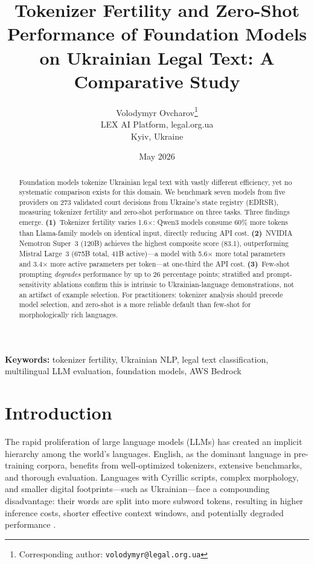 \documentclass[11pt,a4paper]{article}
\title{Tokenizer Fertility and Zero-Shot Performance of Foundation Models\\on Ukrainian Legal Text: A Comparative Study}
\author{
  Volodymyr Ovcharov\thanks{Corresponding author: \texttt{volodymyr@legal.org.ua}} \\
  LEX AI Platform, legal.org.ua \\
  Kyiv, Ukraine
}
\date{May 2026}
\begin{document}
\maketitle

\begin{abstract}
Foundation models tokenize Ukrainian legal text with vastly different efficiency, yet no systematic comparison exists for this domain. We benchmark seven models from five providers on 273 validated court decisions from Ukraine's state registry (EDRSR), measuring tokenizer fertility and zero-shot performance on three tasks. Three findings emerge. \textbf{(1)}~Tokenizer fertility varies 1.6$\times$: Qwen3 models consume 60\% more tokens than Llama-family models on identical input, directly reducing API cost. \textbf{(2)}~NVIDIA Nemotron Super~3 (120B) achieves the highest composite score (83.1), outperforming Mistral Large~3 (675B total, 41B active)---a model with 5.6$\times$ more total parameters and 3.4$\times$ more active parameters per token---at one-third the API cost. \textbf{(3)}~Few-shot prompting \emph{degrades} performance by up to 26 percentage points; stratified and prompt-sensitivity ablations confirm this is intrinsic to Ukrainian-language demonstrations, not an artifact of example selection. For practitioners: tokenizer analysis should precede model selection, and zero-shot is a more reliable default than few-shot for morphologically rich languages.
\end{abstract}

\noindent\textbf{Keywords:} tokenizer fertility, Ukrainian NLP, legal text classification, multilingual LLM evaluation, foundation models, AWS Bedrock

\section{Introduction}

The rapid proliferation of large language models (LLMs) has created an implicit hierarchy among the world's languages. English, as the dominant language in pre-training corpora, benefits from well-optimized tokenizers, extensive benchmarks, and thorough evaluation. Languages with Cyrillic scripts, complex morphology, and smaller digital footprints---such as Ukrainian---face a compounding disadvantage: their words are split into more subword tokens, resulting in higher inference costs, shorter effective context windows, and potentially degraded performance \citep{petrov2024language, ahia2023all}.
\end{document}
